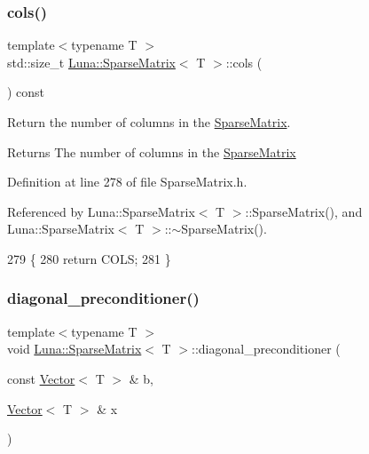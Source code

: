 \subsubsection{\texorpdfstring{cols()}{cols()}}
{\footnotesize\ttfamily template$<$typename T $>$ \\
std\+::size\+\_\+t \hyperlink{classLuna_1_1SparseMatrix}{Luna\+::\+Sparse\+Matrix}$<$ T $>$\+::cols (\begin{DoxyParamCaption}{ }\end{DoxyParamCaption}) const\hspace{0.3cm}{\ttfamily [inline]}}



Return the number of columns in the \hyperlink{classLuna_1_1SparseMatrix}{Sparse\+Matrix}. 

\begin{DoxyReturn}{Returns}
The number of columns in the \hyperlink{classLuna_1_1SparseMatrix}{Sparse\+Matrix} 
\end{DoxyReturn}


Definition at line 278 of file Sparse\+Matrix.\+h.



Referenced by Luna\+::\+Sparse\+Matrix$<$ T $>$\+::\+Sparse\+Matrix(), and Luna\+::\+Sparse\+Matrix$<$ T $>$\+::$\sim$\+Sparse\+Matrix().


\begin{DoxyCode}
279   \{
280     \textcolor{keywordflow}{return} COLS;
281   \}
\end{DoxyCode}
\mbox{\label{classLuna_1_1SparseMatrix_a121eb7123d978c34b9597748f50410cd}} 
\subsubsection{\texorpdfstring{diagonal\+\_\+preconditioner()}{diagonal\_preconditioner()}}
{\footnotesize\ttfamily template$<$typename T $>$ \\
void \hyperlink{classLuna_1_1SparseMatrix}{Luna\+::\+Sparse\+Matrix}$<$ T $>$\+::diagonal\+\_\+preconditioner (\begin{DoxyParamCaption}\item[{const \hyperlink{classLuna_1_1Vector}{Vector}$<$ T $>$ \&}]{b,  }\item[{\hyperlink{classLuna_1_1Vector}{Vector}$<$ T $>$ \&}]{x }\end{DoxyParamCaption})\hspace{0.3cm}{\ttfamily [inline]}}



